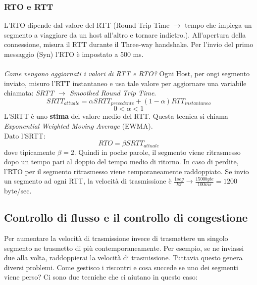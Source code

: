 \documentclass[a4paper]{article}
\begin{document}
\subsubsection{RTO e RTT}

L'RTO dipende dal valore del RTT (Round Trip Time $\rightarrow$ tempo che impiega un segmento a 
viaggiare da un host all'altro e tornare indietro.). All'apertura della connessione, misura il RTT
durante il Three-way handshake. Per l'invio del primo messaggio (Syn) l'RTO è impostato a 500 ms.
\\\\
\textit{Come vengono aggiornati i valori di RTT e RTO?}
 Ogni Host, per ongi segmento inviato, misuro l'RTT instantaneo e usa tale valore per aggiornare una variabile
 chiamata: \textit{SRTT $\rightarrow$ Smoothed Round Trip Time}.
\[SRTT_{attuale} = \alpha SRTT_{precedente} + (1 - \alpha)RTT_{instantaneo}\]
\[0 < \alpha < 1\]
L'SRTT è uno \textbf{stima} del valore medio del RTT. Questa tecnica si chiama \textit{Exponential Weighted Moving Average} (EWMA).
\\ Dato l'SRTT: \[RTO = \beta SRTT_{attuale}\]dove tipicamente $\beta = 2$. Quindi in poche parole, il segmento viene
ritrasmesso dopo un tempo pari al doppio del tempo medio di ritorno. In caso di perdite, l'RTO per il segmento
ritrasmesso  viene temporaneamente raddoppiato. Se invio un segmento ad ogni RTT, la velocità di trasmissione
è  $\frac{1 seg}{k\pi} \rightarrow \frac{1500 byte}{100ms} = 1200$ byte/sec.

\subsection{Controllo di flusso e il controllo di congestione}

Per aumentare la velocità di trasmissione invece di trasmettere un singolo segmento ne trasmetto di più contemporaneamente. Per esempio, se ne inviassi
due alla volta, raddoppierai la velocità di trasmissione. Tuttavia questo genera diversi problemi. Come gestisco i riscontri
e cosa succede se uno dei segmenti viene perso? Ci sono due tecniche che ci aiutano in questo caso:
\end{document}
